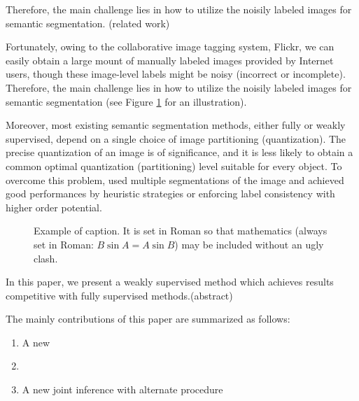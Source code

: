 Therefore, the main challenge lies in how to utilize the noisily labeled images for semantic segmentation. (related work)

\if
 Fortunately, owing to the collaborative image tagging system, \eg Flickr, we can easily obtain a large mount of manually labeled images provided by Internet users, though these image-level labels might be noisy (incorrect or incomplete). Therefore, the main challenge lies in how to utilize the noisily labeled images for semantic segmentation (see Figure \ref{fig:noisylabel} for an illustration).


 Moreover, most existing semantic segmentation methods, either fully or weakly supervised, depend on a single choice of image partitioning (quantization). The precise quantization of an image is of significance, and it is less likely to obtain a common optimal quantization (partitioning) level suitable for every object. To overcome this problem, \cite{hoiem2005geometric,kohli2009robust,ladicky2009associative,nowozin2010parameter,russell2006using} used multiple segmentations of the image and achieved good performances by heuristic strategies or enforcing label consistency with higher order potential.
\fi

\begin{figure}[t]
\begin{center}
\fbox{\rule{0pt}{2in} \rule{0.9\linewidth}{0pt}}
\end{center}
   \caption{Example of caption.  It is set in Roman so that mathematics
   (always set in Roman: $B \sin A = A \sin B$) may be included without an
   ugly clash.}
\label{fig:noisylabel}
\end{figure}

In this paper, we present a weakly supervised method which achieves results competitive with fully supervised methods.(abstract)

The mainly contributions of this paper are summarized as follows:
\begin{enumerate}
  \item A new
  \item
  \item A new joint inference with alternate procedure
\end{enumerate}
